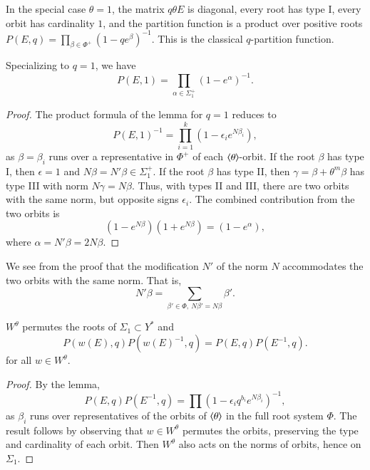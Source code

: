 In the special case $\theta=1$, the matrix $q \theta E$ is diagonal, every root has type I, every orbit has cardinality $1$,
and the partition function
is a product over positive roots 
$P(E,q) = \prod_{\beta\in\Phi^+} (1- q e^\beta)^{-1}$.  This is the classical $q$-partition function.


\begin{corollary}\label{cor:prod1} Specializing to $q=1$, we have
\[
P(E,1) = \prod_{\alpha\in\Sigma^+_1} (1-e^{\alpha})^{-1}.
\]
\end{corollary}

\begin{proof}  The product formula of the lemma for $q=1$ reduces to
\[
P(E,1)^{-1} = \prod_{i=1}^k (1- \epsilon_i e^{N\beta_i}),
\]
as $\beta=\beta_i$ runs over a representative in $\Phi^+$ of each $\langle{\theta}\rangle$-orbit.
If the root $\beta$ has type I, then $\epsilon=1$ and $N\beta = N'\beta \in \Sigma^+_1$.
If the root $\beta$ has type II, then 
$\gamma = \beta+\theta^m\beta$ has type III with norm $N\gamma = N\beta$.
Thus, with types II and III, there are two orbits with the same norm, but opposite signs $\epsilon_i$.  
The combined contribution from the
two orbits is
\[
(1- e^{N\beta})(1+e^{N\beta}) = (1-e^{\alpha}),
\]
where $\alpha = N'\beta = 2N\beta$.
\end{proof}

We see from the proof 
that the modification $N'$ of the norm $N$  accommodates the
two orbits with the same norm.  That is,
\[
N'\beta = \sum_{\beta'\in \Phi, ~N\beta' = N\beta} \beta'.
\]

\begin{corollary}\label{cor:weyl-p}  $W^\theta$ permutes the roots of $\Sigma_1\subset Y^*$ and
\[
P(w(E),q) P(w(E)^{-1},q) = P(E,q)P(E^{-1},q).
\]
for all $w\in W^\theta$.
\end{corollary}

\begin{proof} 
By the lemma,
\[
P(E,q)P(E^{-1},q) = \prod (1- \epsilon_i q^{b_i} e^{N\beta_i})^{-1},
\]
as $\beta_i$ runs over representatives of the orbits of $\langle{\theta}\rangle$ in the full root system $\Phi$.
The result follows by observing  that $w\in W^\theta$ permutes the orbits, preserving the type and cardinality of each orbit.
Then $W^\theta$ also acts on the norms of orbits, hence on $\Sigma_1$.
\end{proof}


